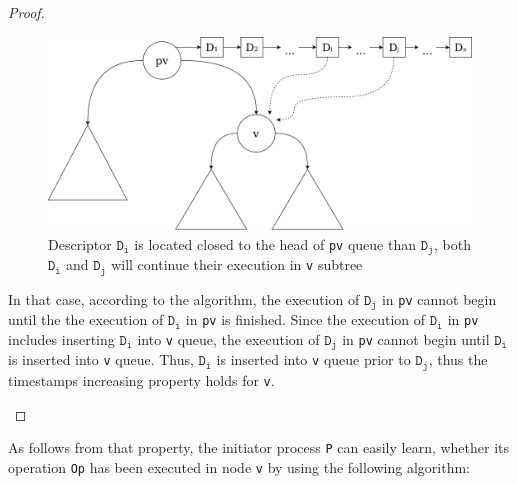 \documentclass[times, dvipsnames,%
               languages={russian,english} %
              ]{itmo-student-thesis}
\begin{document}
\begin{proof}
\begin{itemize}
    \begin{figure}[H]
      \centering
      \caption{Descriptor $\texttt{D}_{\texttt{i}}$ is located closed to the head of \texttt{pv} queue than $\texttt{D}_{\texttt{j}}$, both $\texttt{D}_{\texttt{i}}$ and $\texttt{D}_{\texttt{j}}$ will continue their execution in \texttt{v} subtree}
      \label{timstamps-increasing-proof-pic}
      \includegraphics[width=\linewidth]{pics/timstamps-increasing-proof.png}
    \end{figure}
    
    In that case, according to the algorithm, the execution of $\texttt{D}_{\texttt{j}}$ in \texttt{pv} cannot begin until the the execution of $\texttt{D}_{\texttt{i}}$ in \texttt{pv} is finished. Since the execution of $\texttt{D}_{\texttt{i}}$ in \texttt{pv} includes inserting $\texttt{D}_{\texttt{i}}$ into \texttt{v} queue, the execution of $\texttt{D}_{\texttt{j}}$ in \texttt{pv} cannot begin until $\texttt{D}_{\texttt{i}}$ is inserted into \texttt{v} queue. Thus, $\texttt{D}_{\texttt{i}}$ is inserted into \texttt{v} queue prior to $\texttt{D}_{\texttt{j}}$, thus the timestamps increasing property holds for \texttt{v}.
\end{itemize}
\end{proof}

\bigbreak

As follows from that property, the initiator process \texttt{P} can easily learn, whether its operation \texttt{Op} has been executed in node \texttt{v} by using the following algorithm:
\end{document}
